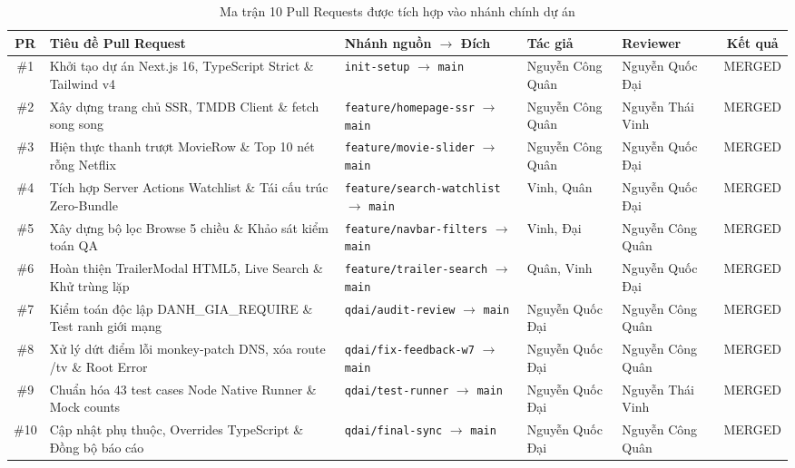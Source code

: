 \documentclass[12pt,a4paper]{extarticle}
\begin{document}
\begin{table}[H]
\centering
\fontsize{7.5}{9.2}\selectfont
\renewcommand{\arraystretch}{1.08}
\caption{Ma trận 10 Pull Requests được tích hợp vào nhánh chính dự án}
\label{tab:pr_matrix}
\begin{tabularx}{\textwidth}{|c|p{4.2cm}|p{3.2cm}|p{2.3cm}|p{2.3cm}|c|}
\hline
\rowcolor{tableheader}
\textbf{PR} & \textbf{Tiêu đề Pull Request} & \textbf{Nhánh nguồn $\rightarrow$ Đích} & \textbf{Tác giả} & \textbf{Reviewer} & \textbf{Kết quả} \\
\hline
\#1 & Khởi tạo dự án Next.js 16, TypeScript Strict \& Tailwind v4 & \texttt{init-setup} $\rightarrow$ \texttt{main} & Nguyễn Công Quân & Nguyễn Quốc Đại & MERGED \\
\hline
\#2 & Xây dựng trang chủ SSR, TMDB Client \& fetch song song & \texttt{feature/homepage-ssr} $\rightarrow$ \texttt{main} & Nguyễn Công Quân & Nguyễn Thái Vinh & MERGED \\
\hline
\#3 & Hiện thực thanh trượt MovieRow \& Top 10 nét rỗng Netflix & \texttt{feature/movie-slider} $\rightarrow$ \texttt{main} & Nguyễn Công Quân & Nguyễn Quốc Đại & MERGED \\
\hline
\#4 & Tích hợp Server Actions Watchlist \& Tái cấu trúc Zero-Bundle & \texttt{feature/search-watchlist} $\rightarrow$ \texttt{main} & Vinh, Quân & Nguyễn Quốc Đại & MERGED \\
\hline
\#5 & Xây dựng bộ lọc Browse 5 chiều \& Khảo sát kiểm toán QA & \texttt{feature/navbar-filters} $\rightarrow$ \texttt{main} & Vinh, Đại & Nguyễn Công Quân & MERGED \\
\hline
\#6 & Hoàn thiện TrailerModal HTML5, Live Search \& Khử trùng lặp & \texttt{feature/trailer-search} $\rightarrow$ \texttt{main} & Quân, Vinh & Nguyễn Quốc Đại & MERGED \\
\hline
\#7 & Kiểm toán độc lập DANH\_GIA\_REQUIRE \& Test ranh giới mạng & \texttt{qdai/audit-review} $\rightarrow$ \texttt{main} & Nguyễn Quốc Đại & Nguyễn Công Quân & MERGED \\
\hline
\#8 & Xử lý dứt điểm lỗi monkey-patch DNS, xóa route /tv \& Root Error & \texttt{qdai/fix-feedback-w7} $\rightarrow$ \texttt{main} & Nguyễn Quốc Đại & Nguyễn Công Quân & MERGED \\
\hline
\#9 & Chuẩn hóa 43 test cases Node Native Runner \& Mock counts & \texttt{qdai/test-runner} $\rightarrow$ \texttt{main} & Nguyễn Quốc Đại & Nguyễn Thái Vinh & MERGED \\
\hline
\#10 & Cập nhật phụ thuộc, Overrides TypeScript \& Đồng bộ báo cáo & \texttt{qdai/final-sync} $\rightarrow$ \texttt{main} & Nguyễn Quốc Đại & Nguyễn Công Quân & MERGED \\
\hline
\end{tabularx}
\end{table}
\end{document}
